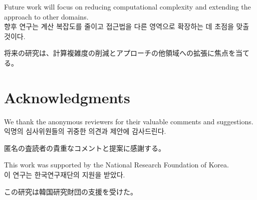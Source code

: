 \documentclass[12pt,a4paper]{article}
\begin{document}
Future work will focus on reducing computational complexity and extending the approach to other domains. \\
향후 연구는 계산 복잡도를 줄이고 접근법을 다른 영역으로 확장하는 데 초점을 맞출 것이다. \\
\begin{CJK}{UTF8}{min}
将来の研究は、計算複雑度の削減とアプローチの他領域への拡張に焦点を当てる。
\end{CJK}

\section*{Acknowledgments}
We thank the anonymous reviewers for their valuable comments and suggestions. \\
익명의 심사위원들의 귀중한 의견과 제안에 감사드린다. \\
\begin{CJK}{UTF8}{min}
匿名の査読者の貴重なコメントと提案に感謝する。
\end{CJK}

This work was supported by the National Research Foundation of Korea. \\
이 연구는 한국연구재단의 지원을 받았다. \\
\begin{CJK}{UTF8}{min}
この研究は韓国研究財団の支援を受けた。
\end{CJK}



\end{document}
